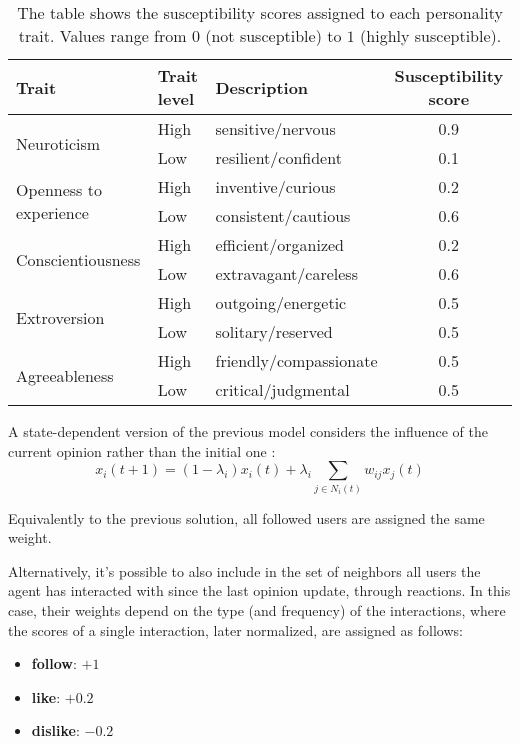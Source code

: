 \begin{table}[h]
\centering
\begin{tabular}{|l|l|l|c|}
\hline
\textbf{Trait} & \textbf{Trait level} & \textbf{Description} & \textbf{Susceptibility score} \\
\hline
\multirow{2}{*}{Neuroticism}       
  & High & sensitive/nervous         & 0.9 \\
  & Low & resilient/confident        & 0.1 \\
\hline
\multirow{2}{*}{Openness to experience}          
  & High & inventive/curious         & 0.2 \\
  & Low & consistent/cautious        & 0.6 \\
\hline
\multirow{2}{*}{Conscientiousness} 
  & High & efficient/organized       & 0.2 \\
  & Low & extravagant/careless       & 0.6 \\
\hline
\multirow{2}{*}{Extroversion}      
  & High & outgoing/energetic        & 0.5 \\
  & Low & solitary/reserved          & 0.5 \\
\hline
\multirow{2}{*}{Agreeableness}     
  & High & friendly/compassionate    & 0.5 \\
  & Low & critical/judgmental        & 0.5 \\
\hline
\end{tabular}
\caption{The table shows the susceptibility scores assigned to each personality trait. Values range from $0$ (not susceptible) to $1$ (highly susceptible).}
\label{tab:susceptibility}
\end{table}

\medskip
A state-dependent version of the previous model considers the influence of the current opinion rather than the initial one \cite{Ye2018Opinion}:
\[
x_i(t + 1) = (1 - \lambda_i) x_i(t) + \lambda_i  \sum_{j \in N_i(t)} w_{ij} x_j (t)
\]

Equivalently to the previous solution, all followed users are assigned the same weight.

Alternatively, it's possible to also include in the set of neighbors all users the agent has interacted with since the last opinion update, through reactions. In this case, their weights depend on the type (and frequency) of the interactions, where the scores of a single interaction, later normalized, are assigned as follows: 
\begin{itemize}
    \item \textbf{follow}: $+1$
    \item \textbf{like}: $+0.2$
    \item \textbf{dislike}: $-0.2$
\end{itemize}

